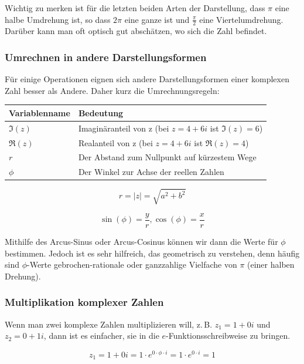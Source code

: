 \documentclass{scrartcl}
\begin{document}
Wichtig zu merken ist für die letzten beiden Arten der Darstellung, dass $\pi$ eine halbe Umdrehung ist, so dass $2\pi$ eine ganze ist
und $\frac{\pi}{2}$ eine Viertelumdrehung. Darüber kann man oft optisch gut abschätzen, wo sich die Zahl befindet.

\subsubsection{Umrechnen in andere Darstellungsformen}

Für einige Operationen eignen sich andere Darstellungsformen einer komplexen Zahl besser als Andere. Daher kurz die Umrechnungsregeln:

\begin{tabular}{|l|l|}
	Variablenname & Bedeutung\\ \hline
	$\Im(z)$ & Imaginäranteil von z (bei $z = 4 + 6i$ ist $\Im(z) = 6$) \\
	$\Re(z)$ & Realanteil von z (bei $z = 4 + 6i$ ist $\Re(z) = 4$) \\
	$r$ & Der Abstand zum Nullpunkt auf kürzestem Wege \\
	$\phi$ & Der Winkel zur Achse der reellen Zahlen\\
\end{tabular}

\begin{equation}
	r = |z| = \sqrt{a^2 + b^2}
\end{equation}

\begin{equation}
	\sin(\phi) = \frac{y}{r}, 
	\cos(\phi) = \frac{x}{r}
\end{equation}

Mithilfe des Arcus-Sinus oder Arcus-Cosinus können wir dann die Werte für $\phi$ bestimmen. Jedoch ist es sehr hilfreich,
das geometrisch zu verstehen, denn häufig sind $\phi$-Werte gebrochen-rationale oder ganzzahlige Vielfache von $\pi$ (einer halben Drehung).

\subsubsection{Multiplikation komplexer Zahlen}

Wenn man zwei komplexe Zahlen multiplizieren will, z.\,B. $z_1 = 1 + 0i$ und $z_2 = 0 + 1i$, dann ist es einfacher,
sie in die $e$-Funktionsschreibweise zu bringen.

\begin{equation}
	z_1 = 1 + 0i = 1 \cdot e^{0\cdot \phi \cdot i} = 1 \cdot e^{0\cdot i} = 1
\end{equation}
\end{document}
